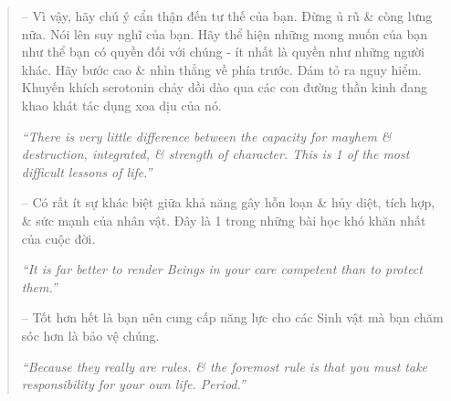 \documentclass{article}
\begin{document}
\begin{enumerate}
\begin{quotation}
		-- Vì vậy, hãy chú ý cẩn thận đến tư thế của bạn. Đừng ủ rũ \& còng lưng nữa. Nói lên suy nghĩ của bạn. Hãy thể hiện những mong muốn của bạn như thể bạn có quyền đối với chúng - ít nhất là quyền như những người khác. Hãy bước cao \& nhìn thẳng về phía trước. Dám tỏ ra nguy hiểm. Khuyến khích serotonin chảy dồi dào qua các con đường thần kinh đang khao khát tác dụng xoa dịu của nó.

		{\it``There is very little difference between the capacity for mayhem \& destruction, integrated, \& strength of character. This is 1 of the most difficult lessons of life.''}

		-- Có rất ít sự khác biệt giữa khả năng gây hỗn loạn \& hủy diệt, tích hợp, \& sức mạnh của nhân vật. Đây là 1 trong những bài học khó khăn nhất của cuộc đời.

		{\it``It is far better to render Beings in your care competent than to protect them.''}

		-- Tốt hơn hết là bạn nên cung cấp năng lực cho các Sinh vật mà bạn chăm sóc hơn là bảo vệ chúng.

		{\it``Because they really are rules. \& the foremost rule is that you must take responsibility for your own life. Period.''}


\end{quotation}
\end{enumerate}
\end{document}
